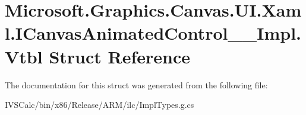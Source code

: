 \hypertarget{struct_microsoft_1_1_graphics_1_1_canvas_1_1_u_i_1_1_xaml_1_1_i_canvas_animated_control_____impl_1_1_vtbl}{}\section{Microsoft.\+Graphics.\+Canvas.\+U\+I.\+Xaml.\+I\+Canvas\+Animated\+Control\+\_\+\+\_\+\+Impl.\+Vtbl Struct Reference}
\label{struct_microsoft_1_1_graphics_1_1_canvas_1_1_u_i_1_1_xaml_1_1_i_canvas_animated_control_____impl_1_1_vtbl}


The documentation for this struct was generated from the following file\+:\begin{DoxyCompactItemize}
\item 
I\+V\+S\+Calc/bin/x86/\+Release/\+A\+R\+M/ilc/Impl\+Types.\+g.\+cs\end{DoxyCompactItemize}
